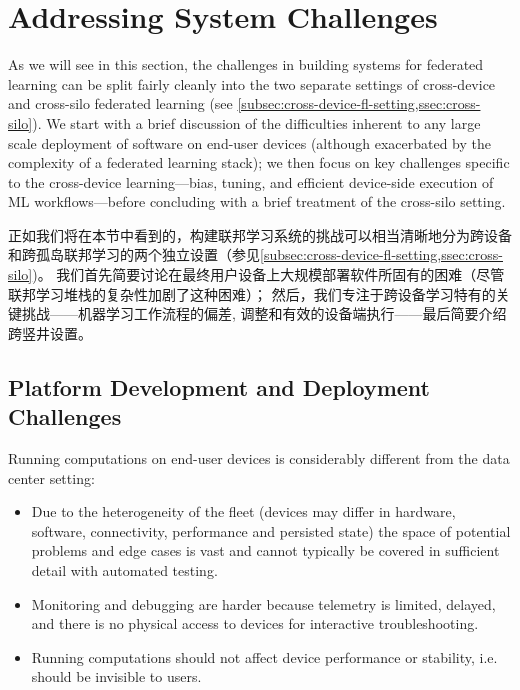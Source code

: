 
\section{Addressing System Challenges}
As we will see in this section, the challenges in building systems for federated learning can be split fairly cleanly into the two separate settings of cross-device and cross-silo federated learning (see \cref{subsec:cross-device-fl-setting,ssec:cross-silo}). We start with a brief discussion of the difficulties inherent to any large scale deployment of software on end-user devices (although exacerbated by the complexity of a federated learning stack); we then focus on key challenges specific to the cross-device learning---bias, tuning, and efficient device-side execution of ML workflows---before concluding with a brief treatment of the cross-silo setting.

正如我们将在本节中看到的，构建联邦学习系统的挑战可以相当清晰地分为跨设备和跨孤岛联邦学习的两个独立设置（参见\cref{subsec:cross-device-fl-setting,ssec:cross-silo})。 我们首先简要讨论在最终用户设备上大规模部署软件所固有的困难（尽管联邦学习堆栈的复杂性加剧了这种困难）； 然后，我们专注于跨设备学习特有的关键挑战——机器学习工作流程的偏差, 调整和有效的设备端执行——最后简要介绍跨竖井设置。
\subsection{Platform Development and Deployment Challenges}
\label{subsec:systems-platform-development-and-deployment-challenges}

Running computations on end-user devices is considerably different from the data center setting:
\begin{itemize}
    \item Due to the heterogeneity of the fleet (devices may differ in hardware, software, connectivity, performance and persisted state) the space of potential problems and edge cases is vast and cannot typically be covered in sufficient detail with automated testing.
    \item Monitoring and debugging are harder because telemetry is limited, delayed, and there is no physical access to devices for interactive troubleshooting.
    \item Running computations should not affect device performance or stability, i.e. should be invisible to users.
\end{itemize}

